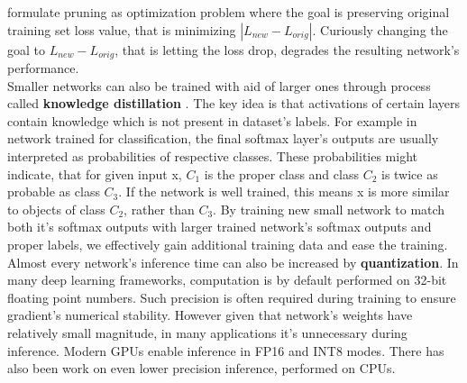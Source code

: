 \documentclass[../Main.tex]{subfiles}
\begin{document}
    \cite{molchanov2016pruning} formulate pruning as optimization problem where
    the goal is preserving original training set loss value, that is minimizing
    $|L_{new} - L_{orig}|$. Curiously changing the goal to $L_{new} - L_{orig}$,
    that is letting the loss drop, degrades the resulting network's performance.\\
    Smaller networks can also be trained with aid of larger ones through process called
    \textbf{knowledge distillation} \cite{hinton2015distilling}. 
    The key idea is that activations of certain layers
    contain knowledge which is not present in dataset's labels. For example in network 
    trained for classification, the final softmax layer's outputs are usually 
    interpreted as probabilities of respective classes. These probabilities might indicate,
    that for given input x, $C_1$ is the proper class and class $C_2$ is twice as probable 
    as class $C_3$. If the network is well trained, this means x is more similar to
    objects of class $C_2$, rather than $C_3$. By training new small network to match both
    it's softmax outputs with larger trained network's softmax outputs and proper labels,
    we effectively gain additional training data and ease the training.
    Almost every network's inference time can also be increased by \textbf{quantization}.
    In many deep learning frameworks, computation is by default performed on
    32-bit floating point numbers. Such precision is often required during training to 
    ensure gradient's numerical stability. However given that network's weights have
    relatively small magnitude, in many applications it's unnecessary during inference.
    Modern GPUs enable inference in FP16 and INT8 modes. There has also been work 
    on even lower precision inference, performed on CPUs. 
    
        
\biblio %
\end{document}
